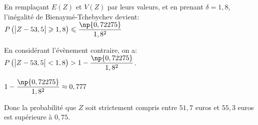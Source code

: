 \begin{enumerate}[resume]
En remplaçant $E(Z)$ et $V(Z)$ par leurs valeurs, et en prenant $\delta=1,8$, l'inégalité de Bienaymé-Tchebychev devient:
$P\left ( \left |Z-53,5\strut \right | \geqslant 1,8 \right ) \leqslant \dfrac{\np{0,72275}}{1,8^2}$

En considérant l'évènement contraire, on a:
$P\left ( \left |Z-53,5\strut \right | < 1,8 \right ) > 1-  \dfrac{\np{0,72275}}{1,8^2}$.

$1- \dfrac{\np{0,72275}}{1,8^2} \approx 0,777$

Donc la probabilité que $Z$ soit strictement compris entre $51,7$ euros et $55,3$ euros est supérieure à $0,75$.
\end{enumerate}















\bigskip

